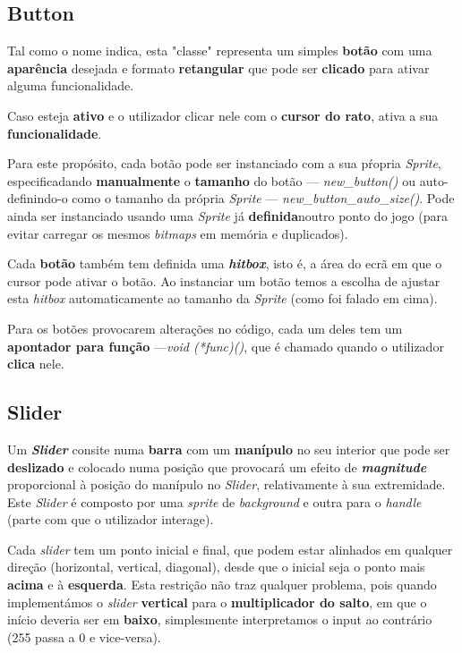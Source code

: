 \documentclass{report}
\begin{document}
\subsection{Button}

Tal como o nome indica, esta "classe" representa um simples \textbf{botão} com uma \textbf{aparência} desejada e formato \textbf{retangular} que pode ser \textbf{clicado} para ativar alguma funcionalidade.

Caso esteja \textbf{ativo} e o utilizador clicar nele com o \textbf{cursor do rato}, ativa a sua \textbf{funcionalidade}.

Para este propósito, cada botão pode ser instanciado com a sua pŕopria \textit{Sprite}, especificadando \textbf{manualmente} o \textbf{tamanho} do botão --- \textit{new\_button()} ou auto-definindo-o como o tamanho da própria \textit{Sprite} --- \textit{new\_button\_auto\_size()}.
Pode ainda ser instanciado usando uma \textit{Sprite} já \textbf{definida}noutro ponto do jogo (para evitar carregar os mesmos \textit{bitmaps} em memória e duplicados).

Cada \textbf{botão} também tem definida uma \textbf{\textit{hitbox}}, isto é, a área do ecrã em que o cursor pode ativar o botão. Ao instanciar um botão temos a escolha de ajustar esta \textit{hitbox} automaticamente ao tamanho da \textit{Sprite} (como foi falado em cima).

Para os botões provocarem alterações no código, cada um deles tem um \textbf{apontador para função} ---\textit{void (*func)()}, que é chamado quando o utilizador \textbf{clica} nele.

\subsection{Slider}

Um \textbf{\textit{Slider}} consite numa \textbf{barra} com um \textbf{manípulo} no seu interior que pode ser \textbf{deslizado} e colocado numa posição que provocará um efeito de \textbf{\textit{magnitude}} proporcional à posição do manípulo no \textit{Slider}, relativamente à sua extremidade. Este \textit{Slider} é composto por uma \textit{sprite} de \textit{background} e outra para o \textit{handle} (parte com que o utilizador interage).

Cada \textit{slider} tem um ponto inicial e final, que podem estar alinhados em qualquer direção (horizontal, vertical, diagonal), desde que o inicial seja o ponto mais \textbf{acima} e à \textbf{esquerda}. Esta restrição não traz qualquer problema, pois quando implementámos o \textit{slider} \textbf{vertical} para o \textbf{multiplicador do salto}, em que o início deveria ser em \textbf{baixo}, simplesmente interpretamos o input ao contrário (255 passa a 0 e vice-versa).
\end{document}
